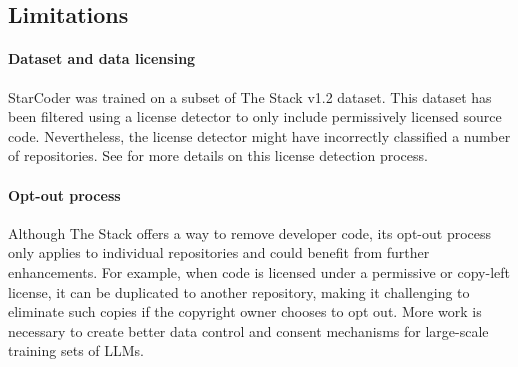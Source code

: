 \documentclass[10pt]{article} %
\begin{document}
\subsection{Limitations}
\paragraph{Dataset and data licensing} StarCoder was trained on a subset of The Stack v1.2 dataset. %
This dataset has been filtered using a license detector to only include permissively licensed source code. Nevertheless, the license detector might have incorrectly classified a number of repositories. See \citet{Kocetkov2022TheStack} for more details on this license detection process. 




\paragraph{Opt-out process} Although The Stack offers a way to remove developer code, its opt-out process only applies to individual repositories and could benefit from further enhancements. For example, when code is licensed under a permissive or copy-left license, it can be duplicated to another repository, making it challenging to eliminate such copies if the copyright owner chooses to opt out. More work is necessary to create better data control and consent mechanisms for large-scale training sets of LLMs. 

 
\end{document}
